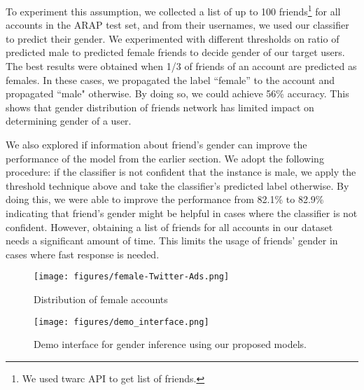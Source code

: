 \documentclass[sigconf,authorversion,nonacm]{acmart}
\begin{document}
To experiment this assumption, we collected a list of up to 100 friends\footnote{We used twarc API to get list of friends.} for all accounts in the ARAP test set, and from their usernames, we used our classifier to predict their gender. We experimented with different thresholds on ratio of predicted male to predicted female friends to decide gender of our target users. The best results were obtained when 1/3 of friends of an account are predicted as females. In these cases, we propagated the label ``female'' to the account and propagated ``male" otherwise. By doing so, we could achieve 56\% accuracy. This shows that gender distribution of friends network has limited impact on determining gender of a user.

We also explored if information about friend's gender can improve the performance of the model from the earlier section. We adopt the following procedure: if the classifier is not confident that the instance is male, we apply the threshold technique above and take the classifier's predicted label otherwise. By doing this, we were able to improve the performance from 82.1\% to 82.9\% indicating that friend's gender might be helpful in cases where the classifier is not confident.
However, obtaining a list of friends for all accounts in our dataset needs a significant amount of time. This limits the usage of friends' gender in cases where fast response is needed.

\begin{figure*}[!h]
	\begin{center}
		\texttt{[image: figures/female-Twitter-Ads.png]} 
		\caption{Distribution of female accounts}
		\label{fig:female-twitter-ads}
	\end{center}
\end{figure*}
\begin{figure*}[!tbh]
	\begin{center}
		\texttt{[image: figures/demo\_interface.png]} 
		\caption{Demo interface for gender inference using our proposed models. 
		}
		\label{fig:gender_inf_demo}
	\end{center}
\end{figure*}
\end{document}
